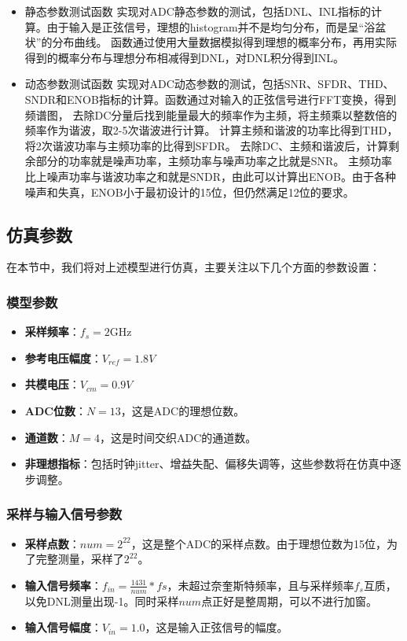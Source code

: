 \documentclass[cs4size,a4paper]{ctexart}
\numberwithin{equation}{section}
\numberwithin{table}{section}
\numberwithin{figure}{section}
\begin{document}
\begin{itemize}
		\item 静态参数测试函数
		实现对ADC静态参数的测试，包括DNL、INL指标的计算。由于输入是正弦信号，理想的histogram并不是均匀分布，而是呈“浴盆状”的分布曲线。
		函数通过使用大量数据模拟得到理想的概率分布，再用实际得到的概率分布与理想分布相减得到DNL，对DNL积分得到INL。

		\item 动态参数测试函数
		实现对ADC动态参数的测试，包括SNR、SFDR、THD、SNDR和ENOB指标的计算。函数通过对输入的正弦信号进行FFT变换，得到频谱图，
		去除DC分量后找到能量最大的频率作为主频，将主频乘以整数倍的频率作为谐波，取2-5次谐波进行计算。
		计算主频和谐波的功率比得到THD，将2次谐波功率与主频功率的比得到SFDR。
		去除DC、主频和谐波后，计算剩余部分的功率就是噪声功率，主频功率与噪声功率之比就是SNR。
		主频功率比上噪声功率与谐波功率之和就是SNDR，由此可以计算出ENOB。由于各种噪声和失真，ENOB小于最初设计的15位，但仍然满足12位的要求。

	\end{itemize}
	\subsection{仿真参数}
	在本节中，我们将对上述模型进行仿真，主要关注以下几个方面的参数设置：
	\subsubsection{模型参数}
	\begin{itemize}
		\item \textbf{采样频率}：$f_s = 2 \text{GHz}$
		\item \textbf{参考电压幅度}：$V_{ref} = 1.8V$
		\item \textbf{共模电压}：$V_{cm} = 0.9V$
		\item \textbf{ADC位数}：$N = 13$，这是ADC的理想位数。
		\item \textbf{通道数}：$M = 4$，这是时间交织ADC的通道数。
		\item \textbf{非理想指标}：包括时钟jitter、增益失配、偏移失调等，这些参数将在仿真中逐步调整。
	\end{itemize}

	\subsubsection{采样与输入信号参数}
	\begin{itemize}
		\item \textbf{采样点数}：$num = 2^{22}$，这是整个ADC的采样点数。由于理想位数为15位，为了完整测量，采样了$2^{22}$。
		\item \textbf{输入信号频率}：$f_{in} = \frac{1431}{num} * fs$，未超过奈奎斯特频率，且与采样频率$f_s$互质，以免DNL测量出现-1。同时采样$num$点正好是整周期，可以不进行加窗。
		\item \textbf{输入信号幅度}：$V_{in} = 1.0$，这是输入正弦信号的幅度。
	\end{itemize}
\end{document}
